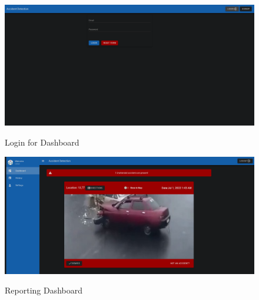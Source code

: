\documentclass[ 12pt,a4paper,twocolumn,fleqn]{article}
\begin{document}
\begin{adjustwidth}{3.5em}{0pt}
\vspace*{\fill}
\begin{figure}[H]
\begin{center}
    \hspace*{0.4in}
    \includegraphics[scale=0.2]{media/login.png}
    \\
  \caption{ Login for Dashboard }
    
\end{center}
\end{figure}

\begin{figure}[H]
\begin{center}
    \hspace{0.2cm}
    
    \hspace*{0.4in}
    \includegraphics[scale=0.2]{media/ui1.png}
    \\
  \caption{ Reporting Dashboard}
    
\end{center}
\end{figure}
\vfill 

\newpage
  \pagestyle{fancy}


\end{adjustwidth}
\end{document}
